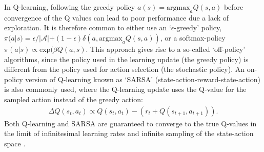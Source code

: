 In Q-learning, following the greedy policy $a(s) = \text{argmax}_{a} Q(s, a)$ before convergence of the Q values can lead to poor performance due a lack of exploration.
It is therefore common to either use an `$\epsilon$-greedy' policy, $\pi(a|s) = \epsilon / |\mathcal{A}| + (1-\epsilon) \delta(a, \text{argmax}_{a} Q(s, a))$, or a softmax-policy $\pi(a|s) \propto \text{exp}(\beta Q(a, s)$.
This approach gives rise to a so-called `off-policy' algorithms, since the policy used in the learning update (the greedy policy) is different from the policy used for action selection (the stochastic policy).
An on-policy version of Q-learning known as `SARSA' (state-action-reward-state-action) is also commonly used, where the Q-learning update uses the Q-value for the sampled action instead of the greedy action:
\begin{align}
    \Delta  Q(s_t,a_t) \propto Q(s_t,a_t) - (r_t + Q(s_{t+1}, a_{t+1})).
\end{align}
Both Q-learning and SARSA are guaranteed to converge to the true Q-values in the limit of infinitesimal learning rates and infinite sampling of the state-action space \citep{watkins1992q,sutton2018reinforcement}.

